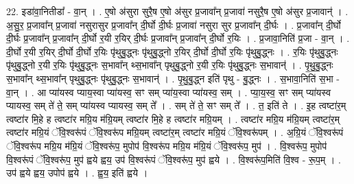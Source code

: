 \documentclass[17pt]{extarticle}
\begin{document}
22. इडा॑वा॒नितीडा᳚ - वा॒न् । . ए॒षो अ॑सुरा सुरै॒ष ए॒षो अ॑सुर प्र॒जावा᳚न् प्र॒जावा॑ नसुरै॒ष ए॒षो अ॑सुर प्र॒जावान्॑ । . अ॒सु॒र॒ प्र॒जावा᳚न् प्र॒जावा॑ नसुरासुर प्र॒जावा᳚न् दी॒र्घो दी॒र्घः प्र॒जावा॑ नसुरा सुर प्र॒जावा᳚न् दी॒र्घः । . प्र॒जावा᳚न् दी॒र्घो दी॒र्घः प्र॒जावा᳚न् प्र॒जावा᳚न् दी॒र्घो र॒यी र॒यिर् दी॒र्घः प्र॒जावा᳚न् प्र॒जावा᳚न् दी॒र्घो र॒यिः । . प्र॒जावा॒निति॑ प्र॒जा - वा॒न् । . दी॒र्घो र॒यी र॒यिर् दी॒र्घो दी॒र्घो र॒यिः पृ॑थुबु॒द्ध्नः पृ॑थुबु॒द्ध्नो र॒यिर् दी॒र्घो दी॒र्घो र॒यिः पृ॑थुबु॒द्ध्नः । . र॒यिः पृ॑थुबु॒द्ध्नः पृ॑थुबु॒द्ध्नो र॒यी र॒यिः पृ॑थुबु॒द्ध्नः स॒भावा᳚न् थ्स॒भावा᳚न् पृथुबु॒द्ध्नो र॒यी र॒यिः पृ॑थुबु॒द्ध्नः स॒भावान्॑ । . पृ॒थु॒बु॒द्ध्नः स॒भावा᳚न् थ्स॒भावा᳚न् पृथुबु॒द्ध्नः पृ॑थुबु॒द्ध्नः स॒भावान्॑ । . पृ॒थु॒बु॒द्ध्न इति॑ पृथु - बु॒द्ध्नः । . स॒भावा॒निति॑ स॒भा - वा॒न् । . आ प्या॑यस्व प्याय॒स्वा प्या॑यस्व॒ सꣳ सम् प्या॑य॒स्वा प्या॑यस्व॒ सम् । . प्या॒य॒स्व॒ सꣳ सम् प्या॑यस्व प्यायस्व॒ सम् ते॑ ते॒ सम् प्या॑यस्व प्यायस्व॒ सम् ते᳚ । . सम् ते॑ ते॒ सꣳ सम् ते᳚ । . त॒ इति॑ ते । . इ॒ह त्वष्टा॑र॒म् त्वष्टा॑र मि॒हे ह त्वष्टा॑र मग्रि॒य म॑ग्रि॒यम् त्वष्टा॑र मि॒हे ह त्वष्टा॑र मग्रि॒यम् । . त्वष्टा॑र मग्रि॒य म॑ग्रि॒यम् त्वष्टा॑र॒म् त्वष्टा॑र मग्रि॒यं ॅवि॒श्वरू॑पं ॅवि॒श्वरू॑प मग्रि॒यम् त्वष्टा॑र॒म् त्वष्टा॑र मग्रि॒यं ॅवि॒श्वरू॑पम् । . अ॒ग्रि॒यं ॅवि॒श्वरू॑पं ॅवि॒श्वरू॑प मग्रि॒य म॑ग्रि॒यं ॅवि॒श्वरू॑प॒ मुपोप॑ वि॒श्वरू॑प मग्रि॒य म॑ग्रि॒यं ॅवि॒श्वरू॑प॒ मुप॑ । . वि॒श्वरू॑प॒ मुपोप॑ वि॒श्वरू॑पं ॅवि॒श्वरू॑प॒ मुप॑ ह्वये ह्वय॒ उप॑ वि॒श्वरू॑पं ॅवि॒श्वरू॑प॒ मुप॑ ह्वये । . वि॒श्वरू॑प॒मिति॑ वि॒श्व - रू॒प॒म् । . उप॑ ह्वये ह्वय॒ उपोप॑ ह्वये । . ह्व॒य॒ इति॑ ह्वये । \newline
\end{document}

